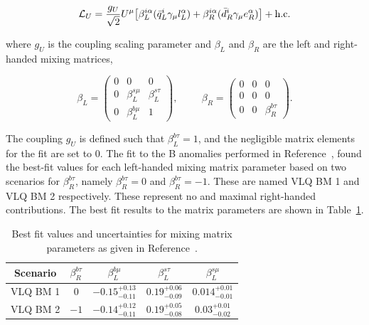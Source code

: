 \begin{equation}
\mathcal{L}_{U} = \frac{g_{U}}{\sqrt{2}} U^{\mu} \big[ \beta_{L}^{i\alpha}( \bar{q}_{L}^{i} \gamma_{\mu} l_{L}^{\alpha}) + \beta_{R}^{i\alpha}( \bar{d}_{R}^{i} \gamma_{\mu} e_{R}^{\alpha}) \big] + \text{h.c.}
\end{equation}

where $g_{U}$ is the coupling scaling parameter and $\beta_{L}$ and $\beta_{R}$ are the left and right-handed mixing matrices,

\begin{equation}
\beta_{L} = 
\begin{pmatrix}
0 & 0 & 0 \\
0 & \beta_{L}^{s\mu} & \beta_{L}^{s\tau} \\
0 & \beta_{L}^{b\mu} & 1
\end{pmatrix},
\hspace{1cm}
\beta_{R} = 
\begin{pmatrix}
0 & 0 & 0 \\
0 & 0 & 0 \\
0 & 0 & \beta_{R}^{b\tau}
\end{pmatrix}.
\end{equation}

The coupling $g_{U}$ is defined such that $\beta_{L}^{b\tau}=1$, and the negligible matrix elements for the fit are set to 0.
The fit to the B anomalies performed in Reference~\cite{Cornella:2021sby}, found the best-fit values for each left-handed mixing matrix parameter based on two scenarios for $\beta^{b\tau}_{R}$, namely $\beta^{b\tau}_{R} = 0$ and $\beta^{b\tau}_{R} = -1$.
These are named VLQ BM 1 and VLQ BM 2 respectively.
These represent no and maximal right-handed contributions. 
The best fit results to the matrix parameters are shown in Table~\ref{tab:vlq_bestfit}.

\begin{table}[h]
\centering
\begin{tabular}{|c|c||c|c|c|}
\hline
Scenario & $\beta^{b\tau}_{R}$ & $\beta^{b\mu}_{L}$ & $\beta^{s\tau}_{L}$ & $\beta^{s\mu}_{L}$ \\
\hline
\hline
VLQ BM 1 & $0$ & $-0.15^{+0.13}_{-0.11}$ & $0.19^{+0.06}_{-0.09}$ & $0.014^{+0.01}_{-0.01}$ \\
VLQ BM 2 & $-1$ & $-0.14^{+0.12}_{-0.11}$ & $0.19^{+0.05}_{-0.08}$ & $0.03^{+0.01}_{-0.02}$ \\
\hline
\end{tabular}
\caption{Best fit values and uncertainties for mixing matrix parameters as given in Reference~\cite{Cornella:2021sby}.}
\label{tab:vlq_bestfit}
\end{table}

